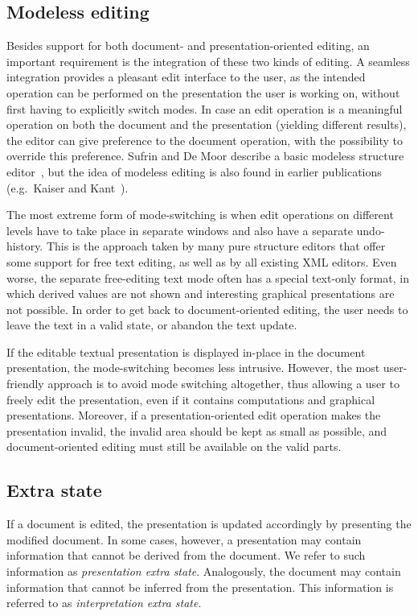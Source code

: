 \documentclass{speauth}
\begin{document}
\subsection{Modeless editing}

Besides support for both document- and presentation-oriented editing, an important requirement is the integration of these two kinds of editing. A seamless integration provides a pleasant edit interface to the user, as the intended operation can be performed on the presentation the user is working on, without first having to explicitly switch modes. In case an edit operation is a meaningful operation on both the document and the presentation (yielding different results), the editor can give preference to the document operation, with the possibility to override this preference. Sufrin and De Moor describe a basic modeless structure editor~\cite{sufrin99modeless}, but the idea of modeless editing is also found in earlier publications (e.g.\ Kaiser and Kant~\cite{kaiser85parsingWithoutParser}).

The most extreme form of mode-switching is when edit operations on different levels have to take place in separate windows and also have a separate undo-history. This is the approach taken by many pure structure editors that offer some support for free text editing, as well as by all existing XML editors. Even worse, the separate free-editing text mode often has a special text-only format, in which derived values are not shown and interesting graphical presentations are not possible. In order to get back to document-oriented editing, the user needs to leave the text in a valid state, or abandon the text update.

If the editable textual presentation is displayed in-place in the document presentation, the mode-switching becomes less intrusive. However, the most user-friendly approach is to avoid mode switching altogether, thus allowing a user to freely edit the presentation, even if it contains computations and graphical presentations. Moreover, if a presentation-oriented edit operation makes the presentation invalid, the invalid area should be kept as small as possible, and document-oriented editing must still be available on the valid parts.

\subsection{Extra state} \label{sect:editingExtraState}

If a document is edited, the presentation is updated accordingly by presenting the modified document. In some cases, however, a presentation may contain information that cannot be derived from the document. We refer to such information as {\em presentation extra state}. Analogously, the document may contain information that cannot be inferred from the presentation. This information is referred to as {\em interpretation extra state}. 
\end{document}
